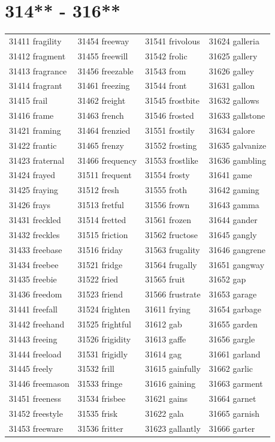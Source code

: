 \documentclass[10pt, oneside]{book}
\begin{document}
\begin{table}
	\centering
	\section*{314** - 316**}
	\begin{tabular}{l l l l}
31411 fragility &31454 freeway &31541 frivolous &31624 galleria\\
31412 fragment &31455 freewill &31542 frolic &31625 gallery\\
31413 fragrance &31456 freezable &31543 from &31626 galley\\
31414 fragrant &31461 freezing &31544 front &31631 gallon\\
31415 frail &31462 freight &31545 frostbite &31632 gallows\\
31416 frame &31463 french &31546 frosted &31633 gallstone\\
31421 framing &31464 frenzied &31551 frostily &31634 galore\\
31422 frantic &31465 frenzy &31552 frosting &31635 galvanize\\
31423 fraternal &31466 frequency &31553 frostlike &31636 gambling\\
31424 frayed &31511 frequent &31554 frosty &31641 game\\
31425 fraying &31512 fresh &31555 froth &31642 gaming\\
31426 frays &31513 fretful &31556 frown &31643 gamma\\
31431 freckled &31514 fretted &31561 frozen &31644 gander\\
31432 freckles &31515 friction &31562 fructose &31645 gangly\\
31433 freebase &31516 friday &31563 frugality &31646 gangrene\\
31434 freebee &31521 fridge &31564 frugally &31651 gangway\\
31435 freebie &31522 fried &31565 fruit &31652 gap\\
31436 freedom &31523 friend &31566 frustrate &31653 garage\\
31441 freefall &31524 frighten &31611 frying &31654 garbage\\
31442 freehand &31525 frightful &31612 gab &31655 garden\\
31443 freeing &31526 frigidity &31613 gaffe &31656 gargle\\
31444 freeload &31531 frigidly &31614 gag &31661 garland\\
31445 freely &31532 frill &31615 gainfully &31662 garlic\\
31446 freemason &31533 fringe &31616 gaining &31663 garment\\
31451 freeness &31534 frisbee &31621 gains &31664 garnet\\
31452 freestyle &31535 frisk &31622 gala &31665 garnish\\
31453 freeware &31536 fritter &31623 gallantly &31666 garter\\
	\end{tabular}
 \end{table}
\clearpage
\end{document}
